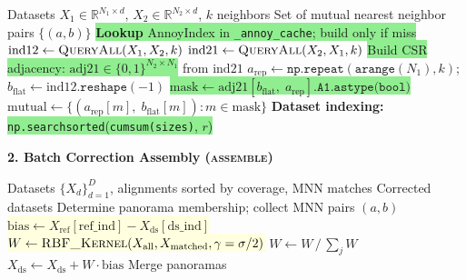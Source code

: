\documentclass[8pt]{article}
\begin{document}
\begin{tcolorbox}[
    title={\textbf{Algorithm 1b:} scanorama\_optimized --- CSR-based MNN with Annoy Caching},
    colback=lightgreen!20, colframe=added!80, fonttitle=\small\bfseries,
    boxrule=0.5pt, arc=2pt, left=4pt, right=4pt, top=2pt, bottom=2pt
]
\begin{algorithmic}[1]
\small
\Require Datasets $X_1 \in \mathbb{R}^{N_1 \times d}$, $X_2 \in \mathbb{R}^{N_2 \times d}$, $k$ neighbors
\Ensure Set of mutual nearest neighbor pairs $\{(a, b)\}$
\State \colorbox{lightgreen}{\textbf{Lookup} AnnoyIndex in \texttt{\_annoy\_cache}; build only if miss} \Comment{\textcolor{added}{Index reuse}}
\State $\text{ind12} \gets \textsc{QueryAll}(X_1, X_2, k)$ 
\State $\text{ind21} \gets \textsc{QueryAll}(X_2, X_1, k)$ 
\State \colorbox{lightgreen}{Build CSR adjacency: $\text{adj21} \in \{0,1\}^{N_2 \times N_1}$} from $\text{ind21}$ \Comment{\textcolor{added}{Sparse membership}}
\State $a_\text{rep} \gets \texttt{np.repeat}(\texttt{arange}(N_1), k)$; \quad $b_\text{flat} \gets \text{ind12}.\texttt{reshape}(-1)$
\State \colorbox{lightgreen}{$\text{mask} \gets \text{adj21}[b_\text{flat},\; a_\text{rep}]\texttt{.A1.astype(bool)}$} \Comment{\textcolor{added}{Vectorized mutual test}}
\State $\text{mutual} \gets \{(a_\text{rep}[m],\; b_\text{flat}[m]) : m \in \text{mask}\}$
\State \textbf{Dataset indexing:} \colorbox{lightgreen}{\texttt{np.searchsorted}(\texttt{cumsum(sizes)}, $r$)} \Comment{\textcolor{added}{Replaces IntervalTree}}
\end{algorithmic}
\end{tcolorbox}

\vspace{6pt}

{\large\bfseries 2. Batch Correction Assembly (\textsc{assemble})}

\vspace{3pt}

\begin{tcolorbox}[
    title={\textbf{Algorithm 2a:} Original Scanorama --- Greedy Pairwise Panorama Merging},
    colback=white, colframe=black!60, fonttitle=\small\bfseries,
    boxrule=0.5pt, arc=2pt, left=4pt, right=4pt, top=2pt, bottom=2pt
]
\begin{algorithmic}[1]
\small
\Require Datasets $\{X_d\}_{d=1}^D$, alignments sorted by coverage, MNN matches
\Ensure Corrected datasets
    \State Determine panorama membership; collect MNN pairs $(a, b)$
    \State \colorbox{lightyellow}{$\text{bias} \gets X_\text{ref}[\text{ref\_ind}] - X_\text{ds}[\text{ds\_ind}]$} 
    \State \colorbox{lightyellow}{$W \gets \textsc{RBF\_Kernel}(X_\text{all}, X_\text{matched}, \gamma = \sigma/2)$} \Comment{\textcolor{removed}{Dense $N \times M$ matrix}}
    \State $W \gets W \,/\, \sum_j W$ 
    \State $X_\text{ds} \gets X_\text{ds} + W \cdot \text{bias}$ 
    \State Merge panoramas
\EndFor
\end{algorithmic}
\end{tcolorbox}
\end{document}
